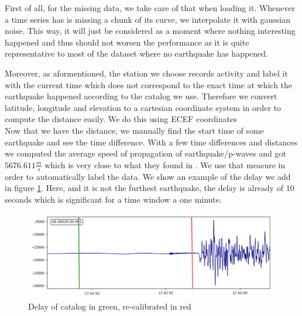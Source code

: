 \documentclass[10pt,conference,compsocconf]{IEEEtran}
\begin{document}
First of all, for the missing data, we take care of that when loading it. Whenever a time series has is missing a chunk of its curve, we interpolate it with gaussian noise. This way, it will just be considered as a moment where nothing interesting happened and thus should not worsen the performance as it is quite representative to most of the dataset where no earthquake has happened.

Moreover, as aformentioned, the station we choose records activity and label it with the current time which does not correspond to the exact time at which the earthquake happened according to the catalog we use. Therefore we convert latitude, longitude and elevation to a cartesian coordinate system in order to compute the distance easily. We do this using ECEF coordinates\cite{ECEFPaper}\\
Now that we have the distance, we manually find the start time of some earthquake and see the time difference. With a few time differences and distances we computed the average speed of propagation of earthquake/p-waves and got $5676.611\frac{m}{s}$ which is very close to what they found in \cite{PWavePaper}. We use that measure in order to automatically label the data. We show an example of the delay we add in figure \ref{fig:timediff}. Here, and it is not the furthest earthquake, the delay is already of $10$ seconds which is significant for a time window a one minute.

\begin{figure}[h]
  \centering
	\includegraphics[width=\columnwidth]{time-diff.png}
  \caption{Delay of catalog in green, re-calibrated in red}
	\label{fig:timediff}
\end{figure}
\end{document}
